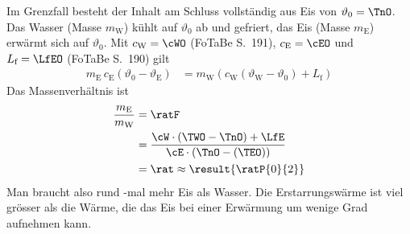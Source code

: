 Im Grenzfall besteht der Inhalt am Schluss vollständig aus Eis von $\vartheta_0 = \TnO$. Das Wasser (Masse $m_\text{W}$) kühlt auf $\vartheta_0$ ab und gefriert, das Eis (Masse $m_\text{E}$) erwärmt sich auf $\vartheta_0$. Mit $c_\text{W} = \cWO$ (FoTaBe S.~191), $c_\text{E} = \cEO$ und $L_\text{f} = \LfEO$ (FoTaBe S.~190) gilt
\begin{align}
 m_\text{E}\,c_\text{E}\left(\vartheta_0-\vartheta_\text{E}\right) &= m_\text{W}\left(c_\text{W}\left(\vartheta_\text{W}-\vartheta_0\right)+L_\text{f}\right)
\end{align}
Das Massenverhältnis ist
\begin{align}
 \frac{m_\text{E}}{m_\text{W}} &= \ratF \\
   &= \frac{\cW\cdot\left(\TWO-\TnO\right)+\LfE}{\cE\cdot\left(\TnO-\left(\TEO\right)\right)} \\
   &= \rat \approx \result{\ratP{0}{2}}
\end{align}
Man braucht also rund -mal mehr Eis als Wasser. Die Erstarrungswärme ist viel grösser als die Wärme, die das Eis bei einer Erwärmung um wenige Grad aufnehmen kann.
